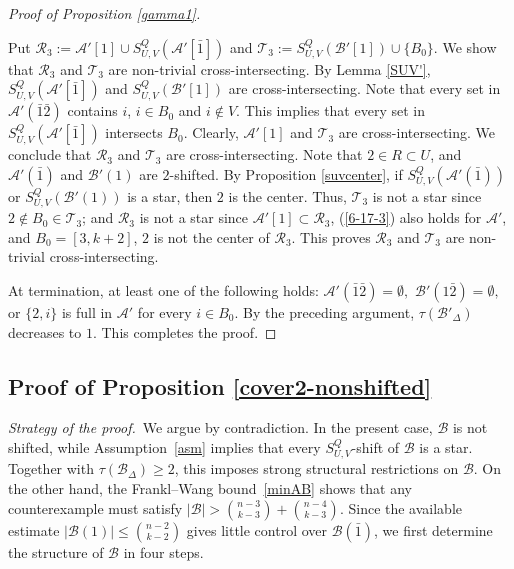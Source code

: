 \documentclass[a4paper,11pt]{article}
\newcommand{\m}{\mathcal}
\begin{document}
\begin{proof}[Proof of Proposition \ref{gamma1}]
\begin{itemize}
Put $\m R_3:=\m A'[1]\cup S_{U,V}^Q(\m A'[\bar1])$ and $\m T_3:=S_{U,V}^Q(\m B'[1])\cup \{B_0\}$.
We show that $\m R_3 $ and $ \m T_3$ are non-trivial cross-intersecting. 
By Lemma \ref{SUV'}, $S_{U,V}^Q(\m A'[\bar1])$ and $S_{U,V}^Q(\m B'[1])$ are cross-intersecting. 
Note that every set in $\m A'(\bar 1\bar 2)$ contains $i$, $i\in B_0$ and $i\notin V$. This implies that every set in $S_{U,V}^Q(\m A'[\bar1])$ intersects $B_0$.
Clearly, $\m A'[1]$ and $\m T_3$ are cross-intersecting. We conclude that $\m R_3$ and $\m T_3$ are cross-intersecting.
Note that $2\in R\subset U$, and $\m A'(\bar1)$ and $\m B'(1)$ are $2$-shifted. By  Proposition \ref{suvcenter}, if $S_{U,V}^Q(\m A'(\bar1))$ or $S_{U,V}^Q(\m B'(1))$ is a star, then $2$ is the center. Thus, $\m T_3$ is not a star since $2\notin B_0\in \m T_3$; and $\m R_3$ is not a star since $\m A'[1]\subset \m R_3$, (\ref{6-17-3}) also holds for $\m A'$, and $B_0=[3,k+2]$, $2$ is not the center of $\m R_3$. This proves $\m R_3$ and $ \m T_3$ are non-trivial cross-intersecting. 
\end{itemize}


At termination, at least one of the following holds: $\mathcal A'(\bar1\bar2)=\emptyset,$ $\mathcal B'(1\bar2)=\emptyset,$ or $\{2,i\}$ is full in $\m A'$ for every $i\in B_0$. 
By the preceding  argument, $\tau(\m B'_{\Delta})$ decreases to $1$. 
This completes the proof.
\end{proof}


\subsection{Proof of Proposition \ref{cover2-nonshifted}}

\noindent\textit{Strategy of the proof.}\,
We argue by contradiction. In the present case, $\mathcal B$ is not
shifted, while Assumption~\ref{asm} implies that every
$S_{U,V}^{Q}$-shift of $\mathcal B$ is a star. Together with
$\tau(\mathcal B_\Delta)\ge2$, this imposes strong structural
restrictions on $\mathcal B$. On the other hand, the Frankl--Wang
bound~\eqref{minAB} shows that any counterexample must satisfy 
$|\mathcal B|>
\binom{n-3}{k-3}+\binom{n-4}{k-3}.$
Since the available estimate
$|\mathcal B(1)|\le\binom{n-2}{k-2}$ gives little control over
$\mathcal B(\bar1)$, we first determine the structure of $\mathcal B$
in four steps. 
\end{document}
